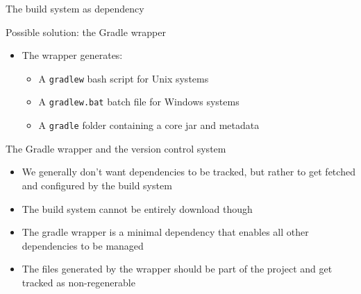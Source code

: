\documentclass[presentation]{beamer}
\begin{document}
\begin{frame}{The build system as dependency}
\begin{block}{Possible solution: the Gradle wrapper}
\begin{itemize}
\begin{itemize}
                \item In case the version is unspecified, the currently installed Gradle version is used
            \end{itemize}
            \item The wrapper generates:
            \begin{itemize}
                \item A \texttt{gradlew} bash script for Unix systems
                \item A \texttt{gradlew.bat} batch file for Windows systems
                \item A \texttt{gradle} folder containing a core jar and metadata
            \end{itemize}
        \end{itemize}
    \end{block}
    \begin{block}{The Gradle wrapper and the version control system}
        \begin{itemize}
            \item We generally don't want dependencies to be tracked, but rather to get fetched and configured by the build system
            \item The build system cannot be entirely download though
            \item The gradle wrapper is a minimal dependency that enables all other dependencies to be managed
            \item The files generated by the wrapper should be part of the project and get tracked as non-regenerable
        \end{itemize}
    \end{block}
\end{frame}
\end{document}
